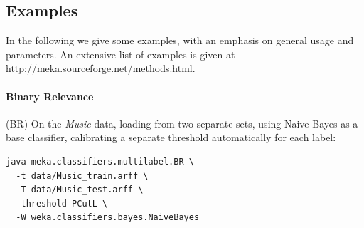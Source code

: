 \documentclass[11pt]{article}
\newcommand{\MEKA}{Meka}
\begin{document}

\subsection{Examples} 

In the following we give some examples, with an emphasis on general usage and parameters. An extensive list of examples is given at \url{http://meka.sourceforge.net/methods.html}. 



\paragraph{Binary Relevance} (BR) On the \textit{Music} data, loading from two separate sets, using Naive Bayes as a base classifier, calibrating a separate threshold automatically for each label: 
\begin{lstlisting}
java meka.classifiers.multilabel.BR \
  -t data/Music_train.arff \
  -T data/Music_test.arff \
  -threshold PCutL \
  -W weka.classifiers.bayes.NaiveBayes
\end{lstlisting}
\end{document}
